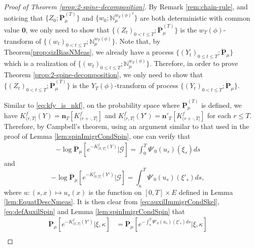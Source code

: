 \begin{proof}[Proof of Theorem \ref{prop:2-spine-decomposition}]
	By Remark \ref{rem:chain-rule}, and noticing that $\{Z_0;\ddot{\mathbf P}^{(T)}_\mu\}$ and $\{w_0;\mathbb N^{w_T(\phi)^2}_\mu\}$ are both deterministic with common value $\mathbf 0$,
	we only need to show that
$\{(Z_t)_{0< t\leq T};\ddot{\mathbf P}^{(T)}_\mu\}$ is the $w_T(\phi)$-transform of $\{(w_t)_{0< t\leq T}; \mathbb N^{w_T(\phi)}_\mu\}$.
	Note that, by Theorem\ref{prop:sizBiasNMeas},
	we already have a process $\{(Y_t)_{0\leq t\leq T}; \dot {\mathbf P}_\mu\}$ which is a realization of $\{(w_t)_{0\leq t\leq T}; \mathbb N^{w_T(\phi)}_\mu\}$.
	Therefore, in order to prove Theorem \ref{prop:2-spine-decomposition},
	we only need to show that
$\{(Z_t)_{0< t\leq T};\ddot{\mathbf P}^{(T)}_\mu\}$ is the $Y_T(\phi)$-transform of process $\{(Y_t)_{0< t\leq T}; \dot {\mathbf P}_\mu\}$.
\par
	Similar to \eqref{eq:kfy_is_nkf}, on the probability space where $\ddot {\mathbf P}^{(T)}_\mu$ is defined, we have $K_{(r, T]}^f(Y) = \mathbf n_T[K^f_{(r+\cdot, T]}]$ and $K_{(r, T]}^f(Y') = \mathbf n'_T[K^f_{(r+\cdot, T]}]$ for each $r\leq T$.
	Therefore, by Campbell's theorem, using an argument similar to that used in the proof of Lemma \ref{lem:spinImigrCondSpin}, one can verify that
\begin{equation}\label{eq:mainImmigrCondSkel}\begin{split}
	- \log\ddot {\mathbf P}_\mu [e^{-K^f_{(0, T]}(Y)}|\mathscr G]
	= \int_0^T\Psi'_0(u_s)(\xi_s)ds
\end{split}\end{equation}
	and
\begin{equation}\label{eq:auxilImmigrCondSkel}
	- \log\ddot {\mathbf P}_\mu [e^{-K^f_{(0, T]}(Y')}|\mathscr G]
	= \int_\kappa^T\Psi'_0(u_s)(\xi'_s)ds,
\end{equation}
	where $u:(s,x)\mapsto u_s(x)$ is the function on $[0,T]\times E$ defined in Lemma \ref{lem:EquatDescNmeas}.
	It is then clear from \eqref{eq:auxilImmigrCondSkel}, \eqref{eq:defAuxilSpin} and Lemma \ref{lem:spinImigrCondSpin} that
\begin{equation}\label{eq:auxilImmigrCondMainSpin}\begin{split}
    \ddot{\mathbf P}_\mu[e^{-K^f_{(0, T]}(Y')}|\xi,\kappa]
	&= \ddot{\mathbf P}_\mu[e^{-\int_\kappa^T\Psi'_0(u_s)(\xi'_s)ds}|\xi,\kappa]\\

\end{split}
\end{equation}
\end{proof}
